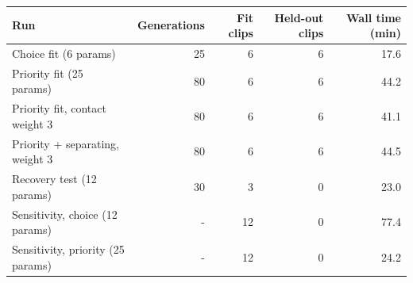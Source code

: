 \begin{tabular}{|l|r|r|r|r|}
\hline
\textbf{Run} & \textbf{Generations} & \textbf{Fit clips} & \textbf{Held-out clips} & \textbf{Wall time (min)} \\
\hline
Choice fit (6 params) & 25 & 6 & 6 & 17.6 \\
Priority fit (25 params) & 80 & 6 & 6 & 44.2 \\
Priority fit, contact weight 3 & 80 & 6 & 6 & 41.1 \\
Priority + separating, weight 3 & 80 & 6 & 6 & 44.5 \\
Recovery test (12 params) & 30 & 3 & 0 & 23.0 \\
Sensitivity, choice (12 params) & - & 12 & 0 & 77.4 \\
Sensitivity, priority (25 params) & - & 12 & 0 & 24.2 \\
\hline
\end{tabular}
